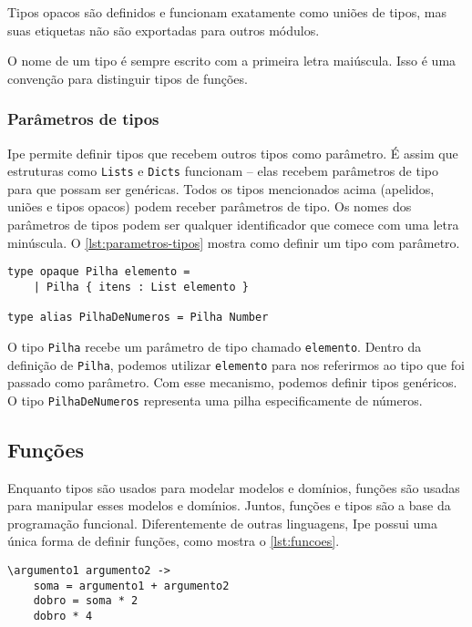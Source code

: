 Tipos opacos são definidos e funcionam exatamente como uniões de tipos, mas suas
etiquetas não são exportadas para outros módulos.

O nome de um tipo é sempre escrito com a primeira letra maiúscula. Isso é uma convenção
para distinguir tipos de funções.

\subsubsection{Parâmetros de tipos}

Ipe permite definir tipos que recebem outros tipos como parâmetro. É assim que
estruturas como \texttt{Lists} e \texttt{Dicts} funcionam -- elas recebem parâmetros
de tipo para que possam ser genéricas. Todos os tipos mencionados acima (apelidos,
uniões e tipos opacos) podem receber parâmetros de tipo. Os nomes dos parâmetros
de tipos podem ser qualquer identificador que comece com uma letra minúscula. O
\autoref{lst:parametros-tipos} mostra como definir um tipo com parâmetro.

\begin{lstlisting}[label={lst:parametros-tipos},caption={Exemplo de como definir um tipo com parâmetro}]
type opaque Pilha elemento =
    | Pilha { itens : List elemento }

type alias PilhaDeNumeros = Pilha Number
\end{lstlisting}

O tipo \texttt{Pilha} recebe um parâmetro de tipo chamado \texttt{elemento}. Dentro
da definição de \texttt{Pilha}, podemos utilizar \texttt{elemento} para nos referirmos
ao tipo que foi passado como parâmetro. Com esse mecanismo, podemos definir tipos
genéricos. O tipo \texttt{PilhaDeNumeros} representa uma pilha especificamente de
números.

\subsection{Funções}

Enquanto tipos são usados para modelar modelos e domínios, funções são
usadas para manipular esses modelos e domínios. Juntos, funções e tipos são a
base da programação funcional. Diferentemente de outras linguagens, Ipe possui
uma única forma de definir funções, como mostra o \autoref{lst:funcoes}.

\begin{lstlisting}[label={lst:funcoes},caption={Exemplo de como definir uma função}]
\argumento1 argumento2 ->
    soma = argumento1 + argumento2
    dobro = soma * 2
    dobro * 4
\end{lstlisting}

